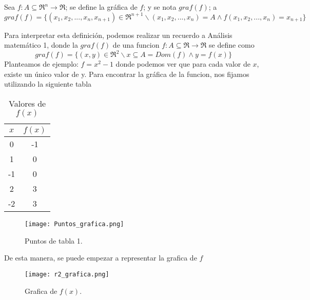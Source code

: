 
\begin{definition} [Grafica de $f$] 
\label{def:grafica}
 \mbox{}
 
Sea $f: A\subseteq\Re^n\rightarrow\Re$; se define la gráfica de $f$; y se nota $graf(f)$; a
 \[
graf(f)=\{(x_1,x_2,...,x_n,x_{n+1})\in\Re^{n+1} \backslash (x_1,x_2,...,x_n)=A \land f(x_1,x_2,...,x_n)=x_{n+1} \}
 \]

Para interpretar esta definición, podemos realizar un recuerdo a Análisis matemático 1, donde la $graf (f)$ de una funcion $f: A\subseteq\Re\rightarrow\Re$ se define como
 \[
graf(f)=\{(x,y)\in\Re^2 \backslash x\subseteq A=Dom(f) \land y=f(x) \}
 \]
Planteamos de ejemplo: $f=x^2-1$ donde podemos ver que para cada valor de $x$, existe un único valor de y. Para encontrar la gráfica de la funcion, nos fijamos utilizando la siguiente tabla
\begin{table}[h!]
\centering
\begin{tabular}{|c|c|}
\hline
\textbf{$x$} & \textbf{$f(x)$}  \\ \hline
0             & -1                         \\ \hline
1             & 0                        \\ \hline
-1             & 0                          \\ \hline
2             & 3                          \\ \hline
-2             & 3                          \\ \hline
\end{tabular}
\caption{Valores de $f(x)$}
\label{tabla1}
\end{table}
\begin{figure}[h!] %
    \centering
    \texttt{[image: Puntos\_grafica.png]} %
    \caption{Puntos de tabla 1.}
    \label{fig:ejemplo} %
\end{figure}


De esta manera, se puede empezar a representar la grafica de $f$
\begin{figure}[h!] %
    \centering
    \texttt{[image: r2\_grafica.png]} %
    \caption{Grafica de $f(x)$.}
    \label{fig:ejemplo} %
\end{figure}
\end{definition}
